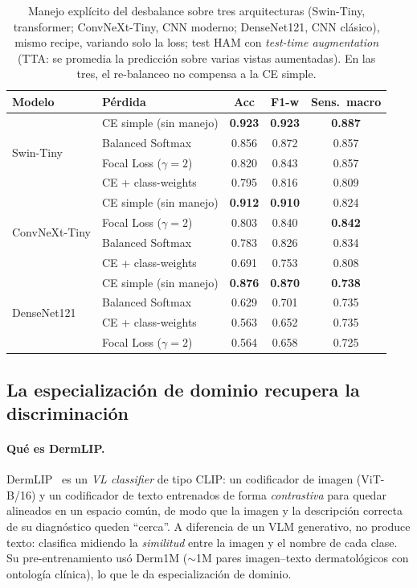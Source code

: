 \documentclass[11pt, a4paper]{article}
\begin{document}
\begin{table}[H]
  \centering
  \caption{Manejo explícito del desbalance sobre tres arquitecturas (Swin-Tiny, transformer; ConvNeXt-Tiny,
  CNN moderno; DenseNet121, CNN clásico), mismo recipe, variando solo la loss; test HAM con
  \emph{test-time augmentation} (TTA: se promedia la predicción sobre varias vistas aumentadas). En las
  tres, el re-balanceo no compensa a la CE simple.}
  \label{tab:desbalance}
  \begin{tabular}{llccc}
    \toprule
    \textbf{Modelo} & \textbf{Pérdida} & \textbf{Acc} & \textbf{F1-w} & \textbf{Sens.\ macro} \\
    \midrule
    \multirow{4}{*}{Swin-Tiny}
      & CE simple (sin manejo) & \textbf{0.923} & \textbf{0.923} & \textbf{0.887} \\
      & Balanced Softmax       & 0.856 & 0.872 & 0.857 \\
      & Focal Loss ($\gamma=2$) & 0.820 & 0.843 & 0.857 \\
      & CE + class-weights     & 0.795 & 0.816 & 0.809 \\
    \midrule
    \multirow{4}{*}{ConvNeXt-Tiny}
      & CE simple (sin manejo) & \textbf{0.912} & \textbf{0.910} & 0.824 \\
      & Focal Loss ($\gamma=2$) & 0.803 & 0.840 & \textbf{0.842} \\
      & Balanced Softmax       & 0.783 & 0.826 & 0.834 \\
      & CE + class-weights     & 0.691 & 0.753 & 0.808 \\
    \midrule
    \multirow{4}{*}{DenseNet121}
      & CE simple (sin manejo) & \textbf{0.876} & \textbf{0.870} & \textbf{0.738} \\
      & Balanced Softmax       & 0.629 & 0.701 & 0.735 \\
      & CE + class-weights     & 0.563 & 0.652 & 0.735 \\
      & Focal Loss ($\gamma=2$) & 0.564 & 0.658 & 0.725 \\
    \bottomrule
  \end{tabular}
\end{table}

\subsection{La especialización de dominio recupera la discriminación}
\label{sec:dermlip}
\paragraph{Qué es DermLIP.} DermLIP~\cite{yan2025derm1m} es un \emph{VL classifier} de tipo CLIP: un
codificador de imagen (ViT-B/16) y un codificador de texto entrenados de forma \emph{contrastiva} para
quedar alineados en un espacio común, de modo que la imagen y la descripción correcta de su diagnóstico
queden ``cerca''. A diferencia de un VLM generativo, no produce texto: clasifica midiendo la
\emph{similitud} entre la imagen y el nombre de cada clase. Su pre-entrenamiento usó Derm1M
($\sim$1M pares imagen--texto dermatológicos con ontología clínica), lo que le da especialización de
dominio.
\end{document}

